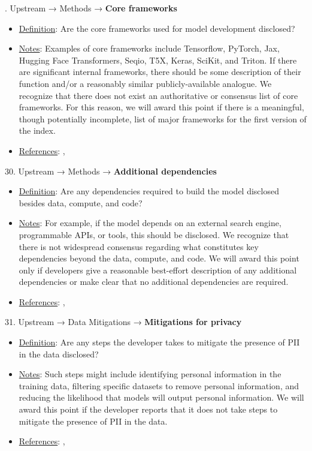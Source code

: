 . Upstream → Methods → \textbf{Core frameworks}
\vspace{-\parskip}
\begin{itemize}
	\item
	\underline{Definition}: Are the core frameworks used for model development disclosed?
	\item
	\underline{Notes}: Examples of core frameworks include Tensorflow, PyTorch, Jax, Hugging Face Transformers, Seqio, T5X, Keras, SciKit, and Triton. If there are significant internal frameworks, there should be some description of their function and/or a reasonably similar publicly-available analogue. We recognize that there does not exist an authoritative or consensus list of core frameworks. For this reason, we will award this point if there is a meaningful, though potentially incomplete, list of major frameworks for the first version of the index.
	\item
	\underline{References}: \citet{mitchell2019model}, \citet{chung2022scaling}
\end{itemize}


30. Upstream → Methods → \textbf{Additional dependencies}
\vspace{-\parskip}
\begin{itemize}
	\item
	\underline{Definition}: Are any dependencies required to build the model disclosed besides data, compute, and code?
	\item
	\underline{Notes}: For example, if the model depends on an external search engine, programmable APIs, or tools, this should be disclosed. We recognize that there is not widespread consensus regarding what constitutes key dependencies beyond the data, compute, and code. We will award this point only if developers give a reasonable best-effort description of any additional dependencies or make clear that no additional dependencies are required.
	\item
	\underline{References}: \citet{lukas2023analyzing}, \citet{kim2023propile}
\end{itemize}


31. Upstream → Data Mitigations → \textbf{Mitigations for privacy}
\vspace{-\parskip}
\begin{itemize}
	\item
	\underline{Definition}: Are any steps the developer takes to mitigate the presence of PII in the data disclosed?
	\item
	\underline{Notes}: Such steps might include identifying personal information in the training data, filtering specific datasets to remove personal information, and reducing the likelihood that models will output personal information. We will award this point if the developer reports that it does not take steps to mitigate the presence of PII in the data.
	\item
	\underline{References}: \citet{kandpal2022deduplicating}, \citet{genlaw2023}
\end{itemize}


